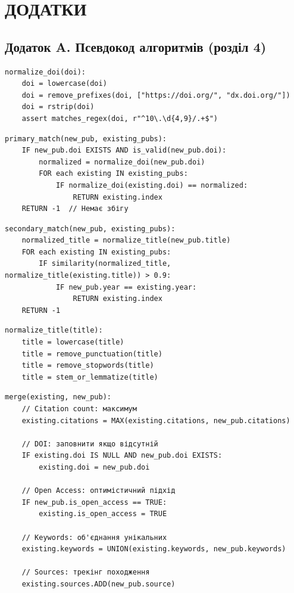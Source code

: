 \section*{ДОДАТКИ}

\subsection*{Додаток A. Псевдокод алгоритмів (розділ 4)}

\begin{lstlisting}[caption={Нормалізація DOI (\texttt{normalize\_doi})},label={lst:a-normalize-doi}]
normalize_doi(doi):
    doi = lowercase(doi)
    doi = remove_prefixes(doi, ["https://doi.org/", "dx.doi.org/"])
    doi = rstrip(doi)
    assert matches_regex(doi, r"^10\.\d{4,9}/.+$")
\end{lstlisting}

\begin{lstlisting}[caption={Первинний матчинг за DOI (\texttt{primary\_match})},label={lst:a-primary-match}]
primary_match(new_pub, existing_pubs):
    IF new_pub.doi EXISTS AND is_valid(new_pub.doi):
        normalized = normalize_doi(new_pub.doi)
        FOR each existing IN existing_pubs:
            IF normalize_doi(existing.doi) == normalized:
                RETURN existing.index
    RETURN -1  // Немає збігу
\end{lstlisting}

\begin{lstlisting}[caption={Вторинний матчинг за Title+Year (\texttt{secondary\_match})},label={lst:a-secondary-match}]
secondary_match(new_pub, existing_pubs):
    normalized_title = normalize_title(new_pub.title)
    FOR each existing IN existing_pubs:
        IF similarity(normalized_title, normalize_title(existing.title)) > 0.9:
            IF new_pub.year == existing.year:
                RETURN existing.index
    RETURN -1
\end{lstlisting}

\begin{lstlisting}[caption={Нормалізація назви (\texttt{normalize\_title})},label={lst:a-normalize-title}]
normalize_title(title):
    title = lowercase(title)
    title = remove_punctuation(title)
    title = remove_stopwords(title)
    title = stem_or_lemmatize(title)
\end{lstlisting}

\begin{lstlisting}[caption={Злиття метаданих (\texttt{merge})},label={lst:a-merge}]
merge(existing, new_pub):
    // Citation count: максимум
    existing.citations = MAX(existing.citations, new_pub.citations)

    // DOI: заповнити якщо відсутній
    IF existing.doi IS NULL AND new_pub.doi EXISTS:
        existing.doi = new_pub.doi

    // Open Access: оптимістичний підхід
    IF new_pub.is_open_access == TRUE:
        existing.is_open_access = TRUE

    // Keywords: об'єднання унікальних
    existing.keywords = UNION(existing.keywords, new_pub.keywords)

    // Sources: трекінг походження
    existing.sources.ADD(new_pub.source)
\end{lstlisting}


